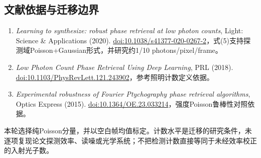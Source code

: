 \documentclass[UTF8,a4paper,11pt,fontset=fandol]{ctexart}
\begin{document}
\subsection*{文献依据与迁移边界}
\begin{enumerate}\raggedright
\item \textit{Learning to synthesize: robust phase retrieval at low photon counts}, Light: Science \& Applications (2020). \newline\href{https://doi.org/10.1038/s41377-020-0267-2}{doi:10.1038/s41377-020-0267-2}，式(5)支持探测域Poisson+Gaussian形式，并研究约1/10 photons/pixel/frame。
\item \textit{Low Photon Count Phase Retrieval Using Deep Learning}, PRL (2018). \newline\href{https://doi.org/10.1103/PhysRevLett.121.243902}{doi:10.1103/PhysRevLett.121.243902}，参考照明计数定义依据。
\item \textit{Experimental robustness of Fourier Ptychography phase retrieval algorithms}, Optics Express (2015). \newline\href{https://doi.org/10.1364/OE.23.033214}{doi:10.1364/OE.23.033214}，强度Poisson鲁棒性对照依据。
\end{enumerate}
本轮选择纯Poisson分量，并以空白帧均值标定。计数水平是迁移的研究条件，未逐项复现论文探测效率、读噪或光学系统；不把检测计数直接等同于未经效率校正的入射光子数。
\end{document}
